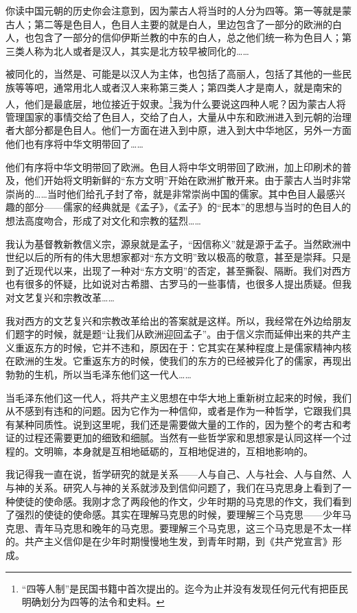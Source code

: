 \documentclass[UTF8, 12pt, a4paper]{ctexrep}
\begin{document}
你读中国元朝的历史你会注意到，因为蒙古人将当时的人分为四等。第一等就是蒙古人；第二等是色目人，色目人主要的就是白人，里边包含了一部分的欧洲的白人，也包含了一部分的信仰伊斯兰教的中东的白人，总之他们统一称为色目人；第三类人称为北人或者是汉人，其实是北方较早被同化的……

被同化的，当然是、可能是以汉人为主体，也包括了高丽人，包括了其他的一些民族等等吧，通常用北人或者汉人来称第三类人；第四类人才是南人，就是南宋的人，他们是最底层，地位接近于奴隶。\footnote{“四等人制”是民国书籍中首次提出的。迄今为止并没有发现任何元代有把臣民明确划分为四等的法令和史料。}我为什么要说这四种人呢？因为蒙古人将管理国家的事情交给了色目人，交给了白人，大量从中东和欧洲进入到元朝的治理者大部分都是色目人。他们一方面在进入到中原，进入到大中华地区，另外一方面他们也有序将中华文明带回了……

他们有序将中华文明带回了欧洲。色目人将中华文明带回了欧洲，加上印刷术的普及，他们开始将文明新鲜的“东方文明”开始在欧洲扩散开来。由于蒙古人当时非常崇尚的……当时他们给孔子封了帝，就是非常崇尚中国的儒家。其中色目人最感兴趣的部分——儒家的经典就是《孟子》，《孟子》的“民本”的思想与当时的色目人的想法高度吻合，形成了对文化和宗教的猛烈……

我认为基督教新教信义宗，源泉就是孟子，“因信称义”就是源于孟子。当然欧洲中世纪以后的所有的伟大思想家都对“东方文明”致以极高的敬意，甚至是崇拜。只是到了近现代以来，出现了一种对“东方文明”的否定，甚至撕裂、隔断。我们对西方也有很多的怀疑，比如说对古希腊、古罗马的一些事情，也很多人提出质疑。但我对文艺复兴和宗教改革……

我对西方的文艺复兴和宗教改革给出的答案就是这样。所以，我经常在外边给朋友们题字的时候，就是题“让我们从欧洲迎回孟子”。由于信义宗而延伸出来的共产主义重返东方的时候，它并不违和，原因在于：它其实在某种程度上是儒家精神内核在欧洲的生发。它重返东方的时候，使我们的东方的已经被异化了的儒家，再现出勃勃的生机，所以当毛泽东他们这一代人……

当毛泽东他们这一代人，将共产主义思想在中华大地上重新树立起来的时候，我们从不感到有违和的问题。因为它作为一种信仰，或者是作为一种哲学，它跟我们具有某种同质性。说到这里呢，我们还是需要做大量的工作的，因为整个的考古和考证的过程还需要更加的细致和细腻。当然有一些哲学家和思想家是认同这样一个过程的。文明嘛，本身就是互相地砥砺的，互相地促进的，互相地影响的。

我记得我一直在说，哲学研究的就是关系——人与自己、人与社会、人与自然、人与神的关系。研究人与神的关系就涉及到信仰问题了，我们在马克思身上看到了一种使徒的使命感。我刚才念了两段他的作文，少年时期的马克思的作文，我们看到了强烈的使徒的使命感。其实在理解马克思的时候，要理解三个马克思——少年马克思、青年马克思和晚年的马克思。要理解三个马克思，这三个马克思是不太一样的。共产主义信仰是在少年时期慢慢地生发，到青年时期，到《共产党宣言》形成。
\end{document}
